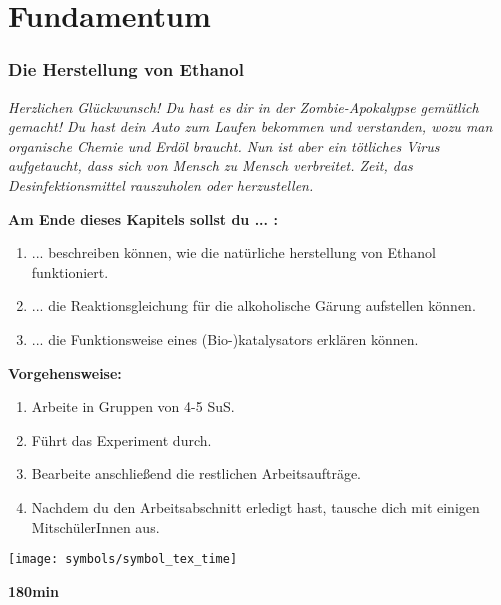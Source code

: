 \documentclass{scrartcl}  %
\begin{document}
\newpage
	\part{Fundamentum}
		\section{Die Herstellung von Ethanol}

			\textit{Herzlichen Glückwunsch! Du hast es dir in der Zombie-Apokalypse gemütlich gemacht! Du hast dein Auto zum Laufen bekommen und verstanden, wozu man organische Chemie und Erdöl braucht. Nun ist aber ein tötliches Virus aufgetaucht, dass sich von Mensch zu Mensch verbreitet. Zeit, das Desinfektionsmittel rauszuholen oder herzustellen.} \newline
			
			\begin{minipage}{0.7\textwidth}
				\noindent \textbf{Am Ende dieses Kapitels sollst du ... :}
				\begin{enumerate}
					\item ... beschreiben können, wie die natürliche herstellung von Ethanol funktioniert.
					\item ... die Reaktionsgleichung für die alkoholische Gärung aufstellen können.
					\item ... die Funktionsweise eines (Bio-)katalysators erklären können.
				\end{enumerate}
				\textbf{Vorgehensweise:}
				\begin{enumerate}
					\item Arbeite in Gruppen von 4-5 SuS.
					\item Führt das Experiment durch.
					\item Bearbeite anschließend die restlichen Arbeitsaufträge.
					\item Nachdem du den Arbeitsabschnitt erledigt hast, tausche dich mit einigen MitschülerInnen aus. 
				\end{enumerate}
				
			\end{minipage}
			\hspace{0.1\textwidth}
			\begin{minipage}{0.2\textwidth}
				\begin{tcolorbox}
					[enhanced,
					width=0.9\textwidth,
					colback=white,
					colframe=black,
					fonttitle=\sffamily\bfseries\large, 
					title=Zeit,  %
					attach boxed title to top center={xshift=-0.0mm,yshift=-0.50mm},
					boxed title style={skin=enhancedfirst jigsaw,size=small,arc=1mm,bottom=-1mm,colframe=black,height=0.75cm},
					colbacktitle=black,
					drop lifted shadow]
					\centering
					\texttt{[image: symbols/symbol\_tex\_time]}
					
					\begin{center}
						\textbf{180min}
					\end{center}
				\end{tcolorbox}
			\end{minipage}
			
\end{document}
